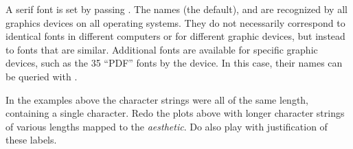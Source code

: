 \documentclass[krantz2]{krantz}\usepackage{knitr}
\begin{document}
A serif font is set by passing . The names  (the default),  and  are recognized by all graphics devices on all operating systems. They do not necessarily correspond to identical fonts in different computers or for different graphic devices, but instead to fonts that are similar. Additional fonts are available for specific graphic devices, such as the 35 ``PDF'' fonts by the  device. In this case, their names can be queried with .

\begin{knitrout}\footnotesize
{}\color{fgcolor}\begin{kframe}
\begin{alltt}
\hlstd{(} 
        \hlstd{=}    \hlopt{+}
  \hlstd{(} \hlstd{=} \hlstd{,}  \hlstd{=} \hlstd{,}  \hlstd{=} \hlstd{,}  \hlstd{=} \hlstd{)} \hlopt{+}
  \hlstd{()}
\end{alltt}
\end{kframe}
\end{knitrout}

\begin{playground}
In the examples above the character strings were all of the same length, containing a single character. Redo the plots above with longer character strings of various lengths mapped to the  \emph{aesthetic}. Do also play with justification of these labels.
\end{playground}
\end{document}
